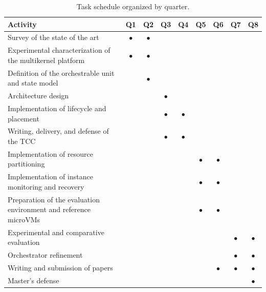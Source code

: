 \documentclass[12pt]{article}
\begin{document}
\begin{table}[ht]
  \centering
  \caption{Task schedule organized by quarter.}
  \label{tab:crono}
  \small
  \renewcommand{\arraystretch}{1.25}
  \begin{tabular}{p{7.2cm}cccccccc}
    \hline
    \textbf{Activity} & Q1 & Q2 & Q3 & Q4 & Q5 & Q6 & Q7 & Q8 \\
    \hline
    Survey of the state of the art                                   & $\bullet$ & $\bullet$ &           &           &           &           &           &           \\
    Experimental characterization of the multikernel platform        & $\bullet$ & $\bullet$ &           &           &           &           &           &           \\
    Definition of the orchestrable unit and state model              &           & $\bullet$ &           &           &           &           &           &           \\
    Architecture design                                              &           &           & $\bullet$ &           &           &           &           &           \\
    Implementation of lifecycle and placement                        &           &           & $\bullet$ & $\bullet$ &           &           &           &           \\
    Writing, delivery, and defense of the TCC                        &           &           & $\bullet$ & $\bullet$ &           &           &           &           \\
    Implementation of resource partitioning                          &           &           &           &           & $\bullet$ & $\bullet$ &           &           \\
    Implementation of instance monitoring and recovery               &           &           &           &           & $\bullet$ & $\bullet$ &           &           \\
    Preparation of the evaluation environment and reference microVMs &           &           &           &           & $\bullet$ & $\bullet$ &           &           \\
    Experimental and comparative evaluation                          &           &           &           &           &           &           & $\bullet$ & $\bullet$ \\
    Orchestrator refinement                                          &           &           &           &           &           &           & $\bullet$ & $\bullet$ \\
    Writing and submission of papers                                 &           &           &           &           &           & $\bullet$ & $\bullet$ & $\bullet$ \\
    Master's defense                                                 &           &           &           &           &           &           &           & $\bullet$ \\
    \hline
  \end{tabular}
\end{table}




\end{document}
